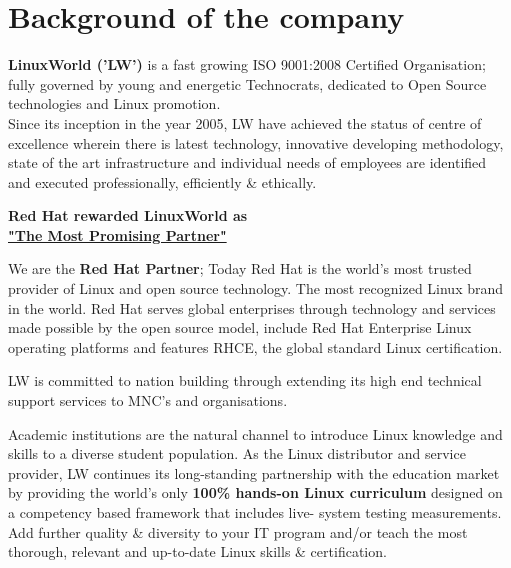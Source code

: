 \documentclass[12pt,oneside,a4paper]{report}
\begin{document}
\section{Background of the company}
\textbf{LinuxWorld ('LW')} is a fast growing ISO 9001:2008 Certified Organisation; fully governed by young and energetic Technocrats, dedicated to Open Source technologies and Linux promotion.\\
Since its inception in the year 2005, LW have achieved the status of centre of excellence wherein there is latest technology, innovative developing methodology, state of the art infrastructure and individual needs of employees are identified and executed professionally, efficiently \& ethically.
\begin{center}
\textbf{ Red Hat rewarded LinuxWorld as\\
\underline{\Large{"The Most Promising Partner"}}}
\end{center}
We are the \textbf{Red Hat Partner}; Today Red Hat is the world's most trusted provider of Linux and open source technology. The most recognized Linux brand in the world. Red Hat serves global enterprises through technology and services made possible by the open source model, include Red Hat Enterprise Linux operating platforms and features RHCE, the global standard Linux certification.

LW is committed to nation building through extending its high end technical support services to MNC's and organisations.

Academic institutions are the natural channel to introduce Linux knowledge and skills to a diverse student population. As the Linux distributor and service provider, LW continues its long-standing partnership with the education market by providing the world's only \textbf{100\% hands-on Linux curriculum} designed on a competency based framework that includes live- system testing measurements. Add further quality \& diversity to your IT program and/or teach the most thorough, relevant and up-to-date Linux skills \& certification.
\end{document}
